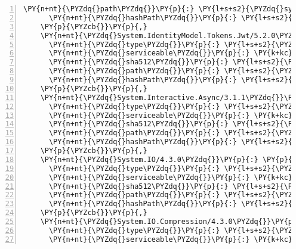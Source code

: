 \begin{Verbatim}[commandchars=\\\{\},numbers=left,firstnumber=1,stepnumber=1,numberblanklines=0]
      \PY{n+nt}{\PYZdq{}path\PYZdq{}}\PY{p}{:} \PY{l+s+s2}{\PYZdq{}system.globalization.extensions/4.3.0\PYZdq{}}\PY{p}{,}
      \PY{n+nt}{\PYZdq{}hashPath\PYZdq{}}\PY{p}{:} \PY{l+s+s2}{\PYZdq{}system.globalization.extensions.4.3.0.nupkg.sha512\PYZdq{}}
    \PY{p}{\PYZcb{}}\PY{p}{,}
    \PY{n+nt}{\PYZdq{}System.IdentityModel.Tokens.Jwt/5.2.0\PYZdq{}}\PY{p}{:} \PY{p}{\PYZob{}}
      \PY{n+nt}{\PYZdq{}type\PYZdq{}}\PY{p}{:} \PY{l+s+s2}{\PYZdq{}package\PYZdq{}}\PY{p}{,}
      \PY{n+nt}{\PYZdq{}serviceable\PYZdq{}}\PY{p}{:} \PY{k+kc}{true}\PY{p}{,}
      \PY{n+nt}{\PYZdq{}sha512\PYZdq{}}\PY{p}{:} \PY{l+s+s2}{\PYZdq{}sha512\PYZhy{}E8tNMfMWPvlSF5fvmMIVZZHlGuIZzE5uktuR+GN2gFdngh0k6xoZquxfjKC02d0NqfsshNQVTCdSKXD5e9/lpA==\PYZdq{}}\PY{p}{,}
      \PY{n+nt}{\PYZdq{}path\PYZdq{}}\PY{p}{:} \PY{l+s+s2}{\PYZdq{}system.identitymodel.tokens.jwt/5.2.0\PYZdq{}}\PY{p}{,}
      \PY{n+nt}{\PYZdq{}hashPath\PYZdq{}}\PY{p}{:} \PY{l+s+s2}{\PYZdq{}system.identitymodel.tokens.jwt.5.2.0.nupkg.sha512\PYZdq{}}
    \PY{p}{\PYZcb{}}\PY{p}{,}
    \PY{n+nt}{\PYZdq{}System.Interactive.Async/3.1.1\PYZdq{}}\PY{p}{:} \PY{p}{\PYZob{}}
      \PY{n+nt}{\PYZdq{}type\PYZdq{}}\PY{p}{:} \PY{l+s+s2}{\PYZdq{}package\PYZdq{}}\PY{p}{,}
      \PY{n+nt}{\PYZdq{}serviceable\PYZdq{}}\PY{p}{:} \PY{k+kc}{true}\PY{p}{,}
      \PY{n+nt}{\PYZdq{}sha512\PYZdq{}}\PY{p}{:} \PY{l+s+s2}{\PYZdq{}sha512\PYZhy{}hZccYiIE5RS1/J9Tb/BNtosAGVggdlsJm4Ojdu+gDV0p4AIi+LUfUogMKkRacljQEJd2AG6vYzvcjhQFkqoZmw==\PYZdq{}}\PY{p}{,}
      \PY{n+nt}{\PYZdq{}path\PYZdq{}}\PY{p}{:} \PY{l+s+s2}{\PYZdq{}system.interactive.async/3.1.1\PYZdq{}}\PY{p}{,}
      \PY{n+nt}{\PYZdq{}hashPath\PYZdq{}}\PY{p}{:} \PY{l+s+s2}{\PYZdq{}system.interactive.async.3.1.1.nupkg.sha512\PYZdq{}}
    \PY{p}{\PYZcb{}}\PY{p}{,}
    \PY{n+nt}{\PYZdq{}System.IO/4.3.0\PYZdq{}}\PY{p}{:} \PY{p}{\PYZob{}}
      \PY{n+nt}{\PYZdq{}type\PYZdq{}}\PY{p}{:} \PY{l+s+s2}{\PYZdq{}package\PYZdq{}}\PY{p}{,}
      \PY{n+nt}{\PYZdq{}serviceable\PYZdq{}}\PY{p}{:} \PY{k+kc}{true}\PY{p}{,}
      \PY{n+nt}{\PYZdq{}sha512\PYZdq{}}\PY{p}{:} \PY{l+s+s2}{\PYZdq{}sha512\PYZhy{}3qjaHvxQPDpSOYICjUoTsmoq5u6QJAFRUITgeT/4gqkF1bajbSmb1kwSxEA8AHlofqgcKJcM8udgieRNhaJ5Cg==\PYZdq{}}\PY{p}{,}
      \PY{n+nt}{\PYZdq{}path\PYZdq{}}\PY{p}{:} \PY{l+s+s2}{\PYZdq{}system.io/4.3.0\PYZdq{}}\PY{p}{,}
      \PY{n+nt}{\PYZdq{}hashPath\PYZdq{}}\PY{p}{:} \PY{l+s+s2}{\PYZdq{}system.io.4.3.0.nupkg.sha512\PYZdq{}}
    \PY{p}{\PYZcb{}}\PY{p}{,}
    \PY{n+nt}{\PYZdq{}System.IO.Compression/4.3.0\PYZdq{}}\PY{p}{:} \PY{p}{\PYZob{}}
      \PY{n+nt}{\PYZdq{}type\PYZdq{}}\PY{p}{:} \PY{l+s+s2}{\PYZdq{}package\PYZdq{}}\PY{p}{,}
      \PY{n+nt}{\PYZdq{}serviceable\PYZdq{}}\PY{p}{:} \PY{k+kc}{true}\PY{p}{,}

\end{Verbatim}
